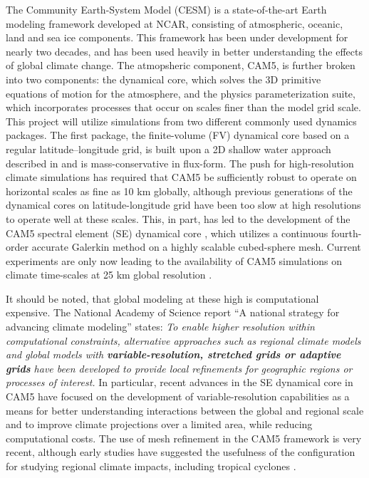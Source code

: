 \documentclass[11pt]{article}
\begin{document}
The Community Earth-System Model (CESM) \citep{RBNetal2010NCAR} is a state-of-the-art Earth modeling framework developed at NCAR, consisting of atmospheric, oceanic, land and sea ice components.  This framework has been under development for nearly two decades, and has been used heavily in better understanding the effects of global climate change.  The atmopsheric component, CAM5, is further broken into two components: the dynamical core, which solves the 3D primitive equations of motion for the atmosphere, and the physics parameterization suite, which incorporates processes that occur on scales finer than the model grid scale. This project will utilize simulations from two different commonly used dynamics packages. The first package, the finite-volume (FV) dynamical core based on a regular latitude--longitude grid, is built upon a 2D shallow water approach described in \citet{Lin1996,Lin1997} and is mass-conservative in flux-form. The push for high-resolution climate simulations has required that CAM5 be sufficiently robust to operate on horizontal scales as fine as 10 km globally, although previous generations of the dynamical cores on latitude-longitude grid have been too slow at high resolutions to operate well at these scales.  This, in part, has led to the development of the CAM5 spectral element (SE) dynamical core \citep{dennis2012cam}, which utilizes a continuous fourth-order accurate Galerkin method on a highly scalable cubed-sphere mesh.  Current experiments are only now leading to the availability of CAM5 simulations on climate time-scales at 25 km global resolution \citep{Bacmeister2014, Wehner2014, Wehner2015, Reed2015b}.

It should be noted, that global modeling at these high is computational expensive.  The National Academy of Science report ``A national strategy for advancing climate modeling'' states: \textit{To enable higher resolution within computational constraints, alternative approaches such as regional climate models and global models with \textbf{variable-resolution, stretched grids or adaptive grids} have been developed to provide local refinements for geographic regions or processes of interest.}  In particular, recent advances in the SE dynamical core in CAM5 have focused on the development of variable-resolution capabilities as a means for better understanding interactions between the global and regional scale and to improve climate projections over a limited area, while reducing computational costs. The use of mesh refinement in the CAM5 framework is very recent, although early studies have suggested the usefulness of the configuration for studying regional climate impacts, including tropical cyclones \citep{Zarzycki2014multidecadal, Zarzycki2015clim}.
\end{document}
